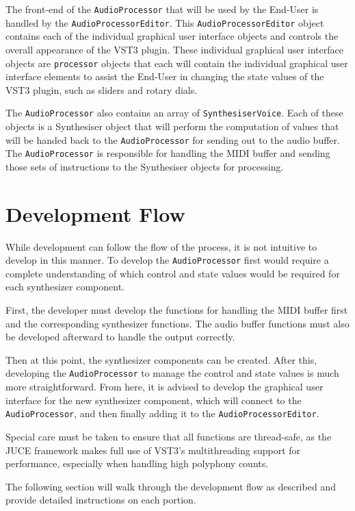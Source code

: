 \documentclass[a4paper,12pt]{report}
\begin{document}
The front-end of the \texttt{AudioProcessor} that will be used by the End-User is handled by the \texttt{AudioProcessorEditor}. This \texttt{AudioProcessorEditor} object contains each of the individual graphical user interface objects and controls the overall appearance of the VST3 plugin. These individual graphical user interface objects are \texttt{processor} objects that each will contain the individual graphical user interface elements to assist the End-User in changing the state values of the VST3 plugin, such as sliders and rotary dials.

The \texttt{AudioProcessor} also contains an array of \texttt{SynthesiserVoice}. Each of these objects is a Synthesiser object that will perform the computation of values that will be handed back to the \texttt{AudioProcessor}  for sending out to the audio buffer. The \texttt{AudioProcessor} is responsible for handling the MIDI buffer and sending those sets of instructions to the Synthesiser objects for processing.

\section{Development Flow}
\label{sec:devflow}
While development can follow the flow of the process, it is not intuitive to develop in this manner. To develop the \texttt{AudioProcessor} first would require a complete understanding of which control and state values would be required for each synthesizer component.

First, the developer must develop the functions for handling the MIDI buffer first and the corresponding synthesizer functions. The audio buffer functions must also be developed afterward to handle the output correctly.

Then at this point, the synthesizer components can be created. After this, developing the \texttt{AudioProcessor} to manage the control and state values is much more straightforward. From here, it is advised to develop the graphical user interface for the new synthesizer component, which will connect to the \texttt{AudioProcessor}, and then finally adding it to the \texttt{AudioProcessorEditor}.

Special care must be taken to ensure that all functions are thread-safe, as the JUCE framework makes full use of VST3's multithreading support for performance, especially when handling high polyphony counts.

The following section will walk through the development flow as described and provide detailed instructions on each portion.
\end{document}
